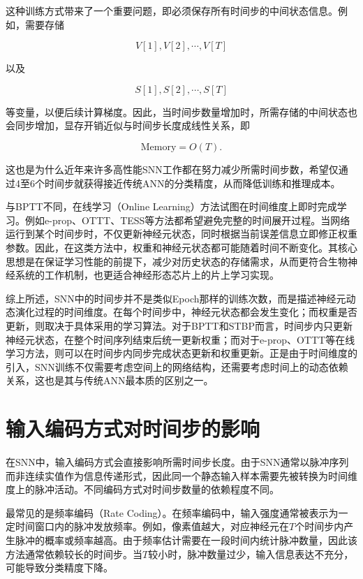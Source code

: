 \documentclass[journal,12pt,onecolumn]{IEEEtran}
\begin{document}
这种训练方式带来了一个重要问题，即必须保存所有时间步的中间状态信息。例如，需要存储

\begin{equation}
V[1],V[2],\cdots,V[T]
\end{equation}

以及

\begin{equation}
S[1],S[2],\cdots,S[T]
\end{equation}

等变量，以便后续计算梯度。因此，当时间步数量增加时，所需存储的中间状态也会同步增加，显存开销近似与时间步长度成线性关系，即

\begin{equation}
\text{Memory} = O(T).
\end{equation}

这也是为什么近年来许多高性能SNN工作都在努力减少所需时间步数，希望仅通过4至6个时间步就获得接近传统ANN的分类精度，从而降低训练和推理成本。

与BPTT不同，在线学习（Online Learning）方法试图在时间维度上即时完成学习。例如e-prop、OTTT、TESS等方法都希望避免完整的时间展开过程。当网络运行到某个时间步时，不仅更新神经元状态，同时根据当前误差信息立即修正权重参数。因此，在这类方法中，权重和神经元状态都可能随着时间不断变化。其核心思想是在保证学习性能的前提下，减少对历史状态的存储需求，从而更符合生物神经系统的工作机制，也更适合神经形态芯片上的片上学习实现。

综上所述，SNN中的时间步并不是类似Epoch那样的训练次数，而是描述神经元动态演化过程的时间维度。在每个时间步中，神经元状态都会发生变化；而权重是否更新，则取决于具体采用的学习算法。对于BPTT和STBP而言，时间步内只更新神经元状态，在整个时间序列结束后统一更新权重；而对于e-prop、OTTT等在线学习方法，则可以在时间步内同步完成状态更新和权重更新。正是由于时间维度的引入，SNN训练不仅需要考虑空间上的网络结构，还需要考虑时间上的动态依赖关系，这也是其与传统ANN最本质的区别之一。

\section{输入编码方式对时间步的影响}

在SNN中，输入编码方式会直接影响所需时间步长度。由于SNN通常以脉冲序列而非连续实值作为信息传递形式，因此同一个静态输入样本需要先被转换为时间维度上的脉冲活动。不同编码方式对时间步数量的依赖程度不同。

最常见的是频率编码（Rate Coding）。在频率编码中，输入强度通常被表示为一定时间窗口内的脉冲发放频率。例如，像素值越大，对应神经元在$T$个时间步内产生脉冲的概率或频率越高。由于频率估计需要在一段时间内统计脉冲数量，因此该方法通常依赖较长的时间步。当$T$较小时，脉冲数量过少，输入信息表达不充分，可能导致分类精度下降。
\end{document}
